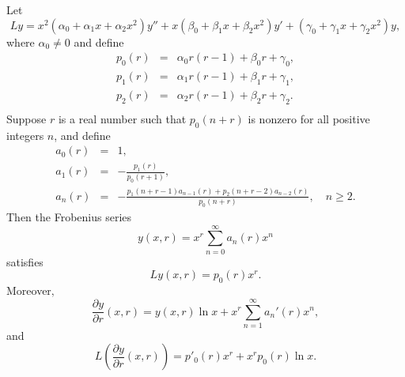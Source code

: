 \documentclass{ximera}
\begin{document}
\begin{theorem}\label{thmtype:7.6.1}
Let
\begin{equation} \label{eq:7.6.2}
Ly=
x^2(\alpha_0+\alpha_1x+\alpha_2x^2)y''+x(\beta_0+\beta_1x+\beta_2x^2)y'
+(\gamma_0+\gamma_1x+\gamma_2x^2)y,
\end{equation}
where $\alpha_0\ne0$ and define
\begin{eqnarray*}
p_0(r)&=&\alpha_0r(r-1)+\beta_0r+\gamma_0,\\
p_1(r)&=&\alpha_1r(r-1)+\beta_1r+\gamma_1,\\
p_2(r)&=&\alpha_2r(r-1)+\beta_2r+\gamma_2.\\
\end{eqnarray*}
Suppose $r$ is
a real number such that $p_0(n+r)$ is nonzero
for all positive integers $n$, and define
$$
\begin{array}{ccl}
a_0(r)&=&1,\\
a_1(r)&=&-\frac{p_1(r)}{p_0(r+1)},\\
a_n(r)&=&-\frac{p_1(n+r-1)a_{n-1}(r)+p_2(n+r-2)a_{n-2}(r)}{p_0(n+r)},\quad n\geq 2.
\end{array}
$$
Then the Frobenius series
\begin{equation} \label{eq:7.6.3}
y(x,r)=x^r\sum_{n=0}^\infty a_n(r)x^n
\end{equation}
satisfies
\begin{equation} \label{eq:7.6.4}
Ly(x,r)=p_0(r)x^r.
\end{equation}
Moreover$,$
\begin{equation} \label{eq:7.6.5}
\frac{\partial y}{\partial r}(x,r)=y(x,r)\ln x+x^r\sum_{n=1}^\infty
a_n'(r) x^n,
\end{equation}
and
\begin{equation} \label{eq:7.6.6}
L\left(\frac{\partial y}{\partial
r}(x,r)\right)=p'_0(r)x^r+x^rp_0(r)\ln x.
\end{equation}
\end{theorem}
\end{document}
